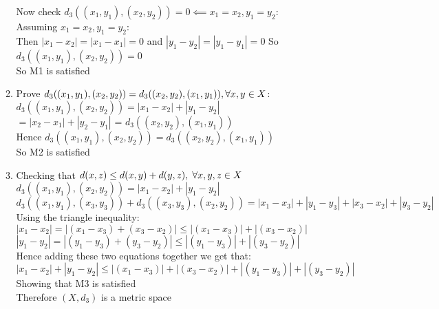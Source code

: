 \documentclass[,oneside]{article}
\numberwithin{equation}{section}
\begin{document}
\begin{enumerate}[label=(\roman*)]
\begin{enumerate}[label=\alph*)]
        Now check $d_3((x_1,y_1),(x_2,y_2)) = 0 \impliedby x_1=x_2, y_1=y_2$:\\
        Assuming $x_1=x_2, y_1=y_2$:\\ Then $|x_1-x_2|=|x_1-x_1|=0$ and $|y_1-y_2|=|y_1-y_1|=0$
        So $d_3((x_1,y_1),(x_2,y_2))=0$\\
        So M1 is satisfied\\
        
        \item Prove $d_3((x_1,y_1),(x_2,y_2))=d_3((x_2,y_2),(x_1,y_1)),\forall x,y\hspace{0.01cm}\in X$: 
        \\ $d_3((x_1,y_1),(x_2,y_2))=|x_1-x_2| + |y_1-y_2|$\\
        $=|x_2-x_1| + |y_2-y_1|$ = $d_3((x_2,y_2),(x_1,y_1))$
        \\Hence $d_3((x_1,y_1),(x_2,y_2))=d_3((x_2,y_2),(x_1,y_1))$ \\
        So M2 is satisfied\\
        \item Checking that $d(x,z) \leq d(x,y) + d(y,z), \hspace{0.1cm} \forall x,y,z \in X$ \\
        $d_3((x_1,y_1),(x_2,y_2))=|x_1-x_2|+|y_1-y_2|$\\
        $d_3((x_1,y_1),(x_3,y_3))+d_3((x_3,y_3),(x_2,y_2))=|x_1-x_3|+|y_1-y_3|+|x_3-x_2|+|y_3-y_2|$\\
        Using the triangle inequality:\\
        $|x_1-x_2| = |(x_1-x_3)+(x_3-x_2)| \leq |(x_1-x_3)| +|(x_3-x_2)|$\\
        $|y_1-y_2| = |(y_1-y_3)+(y_3-y_2)| \leq |(y_1-y_3)| +|(y_3-y_2)|$\\
        Hence adding these two equations together we get that:\\
        $|x_1-x_2| + |y_1-y_2| \leq |(x_1-x_3)| +|(x_3-x_2)| + |(y_1-y_3)| +|(y_3-y_2)|$
        Showing that M3 is satisfied\\
        Therefore $(X,d_3)$ is a metric space\\
        
    \end{enumerate}
    

\end{enumerate}
\end{document}
